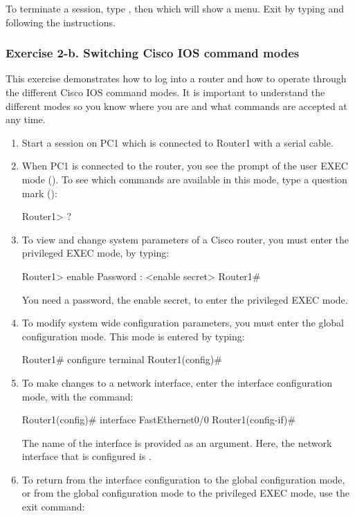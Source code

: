 To terminate a  session, type , then  which will show a menu. Exit by typing  and following the instructions.

\subsubsection{Exercise 2-b. Switching Cisco IOS command modes}

This exercise demonstrates how to log into a router and how to operate through the different Cisco IOS command modes. It is important to understand the different modes so you know where you are and what commands are accepted at any time.
\begin{enumerate}
	\item Start a  session on PC1 which is connected to Router1 with a serial cable.
	\item When PC1 is connected to the router, you see the prompt of the user EXEC mode (). To see which commands are available in this mode, type a question mark ():
		\begin{cmdblock}
	Router1> ?
		\end{cmdblock}
	\item To view and change system parameters of a Cisco router, you must enter the privileged EXEC mode, by typing:
		\begin{cmdblock}
	Router1> enable 
	Password : <enable secret> 
	Router1#
		\end{cmdblock}
		You need a password, the enable secret, to enter the privileged EXEC mode.
	\item To modify system wide configuration parameters, you must enter the global configuration mode. This mode is entered by typing:
		\begin{cmdblock}
	Router1# configure terminal
	Router1(config)#
		\end{cmdblock}
	\item To make changes to a network interface, enter the interface configuration mode, with the command:
		\begin{cmdblock}
	Router1(config)# interface FastEthernet0/0 
	Router1(config-if)#
		\end{cmdblock}
		The name of the interface is provided as an argument. Here, the network interface that is configured is .
	\item To return from the interface configuration to the global configuration mode, or from the global configuration mode to the privileged EXEC mode, use the exit command:

\end{enumerate}
